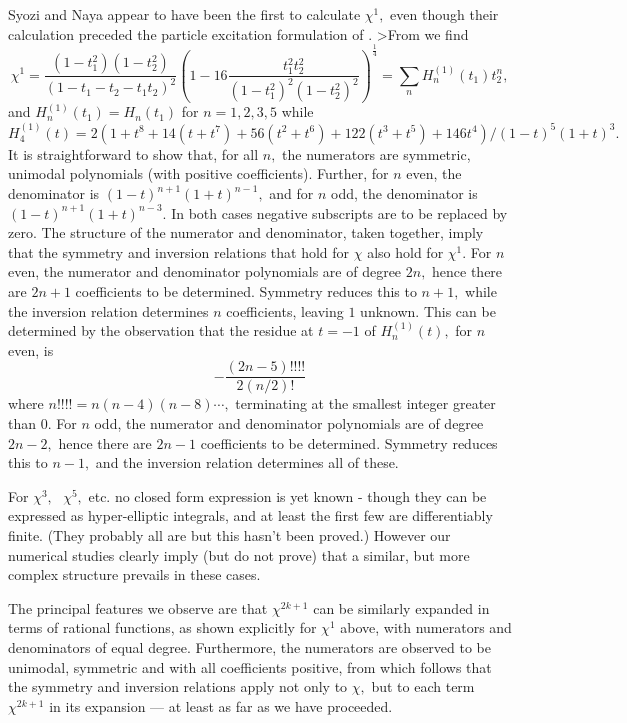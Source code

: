 Syozi and Naya \cite{syo} appear to have been the first to calculate
$\chi^{1},$ even though their calculation preceded the particle
excitation formulation of \cite{Wu76}.
>From \cite{syo} we find
$$\chi^{1} =
\frac{(1-t_1^2)(1-t_2^2)}{(1-t_1-t_2-t_1t_2)^2}(1-16\frac{t_1^2t_2^2}{(1-t_1^2)^2(1-t_2^2)^2})^\frac{1}{4} =\sum_n H_n^{(1)}(t_1)t_2^n,$$
and
$H_n^{(1)}(t_1) = H_n(t_1)$ for $n=1,2,3,5$ while
$$H_4^{(1)}(t) = 2(1 + t^{8} + 14(t+t^7) + 56(t^2+t^6) + 122(t^3+t^5) + 146t^4)/
(1 - t)^5 (1+t)^3.$$
It is straightforward to show that, for all $n,$ the numerators are symmetric,
unimodal polynomials (with positive coefficients). Further, for $n$ even,
the denominator is
$(1-t)^{n+1}(1+t)^{n-1},$ and for $n$ odd, the denominator is 
$(1-t)^{n+1}(1+t)^{n-3}.$ In both cases negative subscripts are to be
replaced by zero. The structure of the numerator and denominator, taken
together, imply that the symmetry and inversion relations that hold
for $\chi$ also hold for $\chi^{1}.$
For $n$ even, the numerator and denominator polynomials
are of degree $2n,$ hence there are $2n+1$ coefficients to be determined.
Symmetry reduces this to $n+1,$ while the inversion relation determines
$n$ coefficients, leaving $1$ unknown. This can be determined by
the observation that the residue  at $t=-1$ of $H_n^{(1)}(t),$ for $n$ even,  is
$$-\frac{(2n-5)!!!!}{2(n/2)!}$$ where $n!!!!=n(n-4)(n-8) \cdots,$ terminating
at the smallest integer greater than $0.$
For $n$ odd, the numerator and denominator polynomials
are of degree $2n-2,$ hence there are $2n-1$ coefficients to be determined.
Symmetry reduces this to $n-1,$ and the inversion relation determines
all of these. 

For $\chi^{3}, \mbox{ } \chi^{5},$ etc. no closed form expression is yet
known - though they can \cite{GGO98} be expressed as hyper-elliptic
integrals, and at least the first few are \cite{BMP98} differentiably finite.
(They probably all are but this hasn't been proved.) However our
numerical studies clearly imply (but do not prove) that a similar, but
more complex structure prevails in these cases.

The principal features we observe are that
$\chi^{2k+1}$ can be similarly expanded in terms of rational functions,
as shown explicitly for $\chi^{1}$ above, with numerators and
denominators of equal degree. Furthermore, the numerators are observed
to be unimodal, symmetric and with all coefficients positive, from
which follows that the symmetry and inversion relations apply not
only to $\chi,$ but to each term $\chi^{2k+1}$ in its expansion ---
at least as far as we have proceeded.

